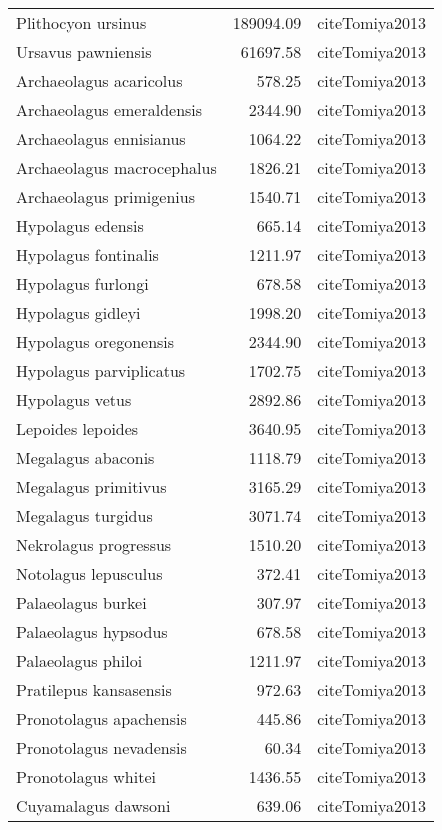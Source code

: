 \begin{table}[ht]
\begin{tabular}{lrl}
  Plithocyon ursinus & 189094.09 & cite{Tomiya2013} \\ 
  Ursavus pawniensis & 61697.58 & cite{Tomiya2013} \\ 
  Archaeolagus acaricolus & 578.25 & cite{Tomiya2013} \\ 
  Archaeolagus emeraldensis & 2344.90 & cite{Tomiya2013} \\ 
  Archaeolagus ennisianus & 1064.22 & cite{Tomiya2013} \\ 
  Archaeolagus macrocephalus & 1826.21 & cite{Tomiya2013} \\ 
  Archaeolagus primigenius & 1540.71 & cite{Tomiya2013} \\ 
  Hypolagus edensis & 665.14 & cite{Tomiya2013} \\ 
  Hypolagus fontinalis & 1211.97 & cite{Tomiya2013} \\ 
  Hypolagus furlongi & 678.58 & cite{Tomiya2013} \\ 
  Hypolagus gidleyi & 1998.20 & cite{Tomiya2013} \\ 
  Hypolagus oregonensis & 2344.90 & cite{Tomiya2013} \\ 
  Hypolagus parviplicatus & 1702.75 & cite{Tomiya2013} \\ 
  Hypolagus vetus & 2892.86 & cite{Tomiya2013} \\ 
  Lepoides lepoides & 3640.95 & cite{Tomiya2013} \\ 
  Megalagus abaconis & 1118.79 & cite{Tomiya2013} \\ 
  Megalagus primitivus & 3165.29 & cite{Tomiya2013} \\ 
  Megalagus turgidus & 3071.74 & cite{Tomiya2013} \\ 
  Nekrolagus progressus & 1510.20 & cite{Tomiya2013} \\ 
  Notolagus lepusculus & 372.41 & cite{Tomiya2013} \\ 
  Palaeolagus burkei & 307.97 & cite{Tomiya2013} \\ 
  Palaeolagus hypsodus & 678.58 & cite{Tomiya2013} \\ 
  Palaeolagus philoi & 1211.97 & cite{Tomiya2013} \\ 
  Pratilepus kansasensis & 972.63 & cite{Tomiya2013} \\ 
  Pronotolagus apachensis & 445.86 & cite{Tomiya2013} \\ 
  Pronotolagus nevadensis & 60.34 & cite{Tomiya2013} \\ 
  Pronotolagus whitei & 1436.55 & cite{Tomiya2013} \\ 
  Cuyamalagus dawsoni & 639.06 & cite{Tomiya2013} \\ 

\end{tabular}
\end{table}
